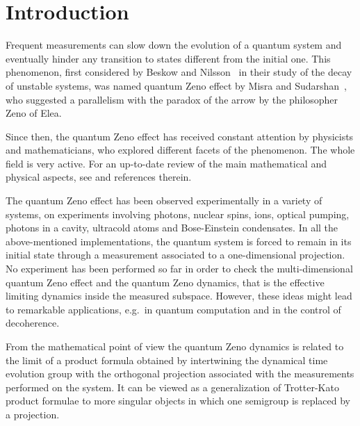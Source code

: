 \documentclass[aip,jmp
]{revtex4}
\theoremstyle{definition}
\begin{document}
\pacs{}%

\maketitle %


\section{\label{sec:intro}Introduction}


Frequent measurements can slow down the evolution of a quantum system and eventually
hinder any transition to states different from the initial one. This
phenomenon, first considered by Beskow and Nilsson~\cite{beskow} in their
study of the decay of unstable systems,
was  named quantum Zeno
effect by Misra and Sudarshan~\cite{misra},
who suggested a parallelism with the paradox of the arrow by the
philosopher Zeno of Elea.

Since then,  the quantum Zeno effect has received constant attention by physicists and mathematicians, who explored different facets of the phenomenon. The whole field is very active. For an up-to-date review of the main mathematical and physical aspects, see \cite{ZenoMP} and references therein.


The  quantum Zeno effect has been observed  experimentally in a variety of systems, on
experiments involving photons, nuclear spins, ions,  optical pumping, photons in a cavity, ultracold atoms and Bose-Einstein condensates. In all the above-mentioned implementations, the quantum system is forced to remain in its
initial state through a measurement associated to a one-dimensional projection. No experiment has been performed so far in order to check the multi-dimensional quantum Zeno effect and the quantum Zeno dynamics, that is the effective limiting dynamics inside the measured subspace. However, these ideas might lead to remarkable applications, e.g.\ in quantum computation and in the control of decoherence.


From the mathematical point of view the quantum Zeno dynamics is related to the
limit of a product formula obtained by intertwining the dynamical time evolution group  with the orthogonal projection associated with the measurements performed on the system. It can be viewed as a generalization of Trotter-Kato product formulae \cite{Trotter1,Trotter2,Kato1,Chernoff}  to more singular objects in which one semigroup is replaced by a  projection.
\end{document}
